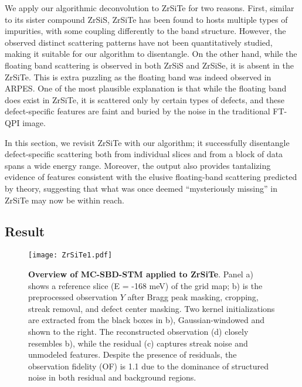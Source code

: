 We apply our algorithmic deconvolution to ZrSiTe for two reasons. First, similar to its sister compound ZrSiS, ZrSiTe has been found to hosts multiple types of impurities, with some coupling differently to the band structure. However, the observed distinct scattering patterns have not been quantitatively studied, making it suitable for our algorithm to disentangle. On the other hand, while the floating band scattering is observed in both ZrSiS\cite{butlerQuasiparticleInterferenceZrSiS2017} and ZrSiSe\cite{buVisualizationElectronicTopology2018}, it is absent in the ZrSiTe\cite{stuartQuasiparticleInterferenceObservation2022}. This is extra puzzling as the floating band was indeed observed in \ac{ARPES}\cite{toppNonsymmorphicBandDegeneracy2016}. One of the most plausible explanation is that while the floating band does exist in ZrSiTe, it is scattered only by certain types of defects, and these defect-specific features are faint and buried by the noise in the traditional FT-QPI image. 

In this section, we revisit ZrSiTe with our algorithm; it successfully disentangle defect-specific scattering both from individual slices and from a block of data spans a wide energy range. Moreover, the output also provides tantalizing evidence of features consistent with the elusive floating-band scattering predicted by theory, suggesting that what was once deemed “mysteriously missing” in ZrSiTe may now be within reach.

\subsection{Result}

\begin{figure}
	\texttt{[image: ZrSiTe1.pdf]} 
	\centering
	\caption[\textbf{Overview of MC-SBD-STM applied to ZrSiTe}]{\textbf{Overview of MC-SBD-STM applied to ZrSiTe}. Panel a) shows a reference slice (E = -168 meV) of the grid map; b) is the preprocessed observation $Y$ after Bragg peak masking, cropping, streak removal, and defect center masking. Two kernel initializations are extracted from the black boxes in b), Gaussian-windowed and shown to the right. The reconstructed observation (d) closely resembles b), while the residual (c) captures streak noise and unmodeled features. Despite the presence of residuals, the observation fidelity (OF) is 1.1 due to the dominance of structured noise in both residual and background regions.}
	\label{fig:ZrSiTe1}
\end{figure}

